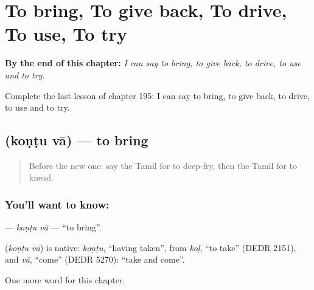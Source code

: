 
\chapter{To bring, To give back, To drive, To use, To try}
\label{ch:ta-to-bring-to-give-back-to-drive-to-use-to-try}

\begin{chapteropening}
\textbf{By the end of this chapter:} \emph{I can say to bring, to give back, to drive, to use and to try.}

Complete the last lesson of chapter 195: I can say to bring, to give back, to drive, to use and to try.
\end{chapteropening}

\section[\texorpdfstring{\ta{கொண்டு} \ta{வா} (koṇṭu vā)}{கொண்டு வா (koṇṭu vā)}]{  (koṇṭu vā) — to bring}

\label{lesson:TA-C195-kontu-va}



\begin{quote}
Before the new one: say the Tamil for to deep-fry, then the Tamil for to knead.
\end{quote}

\subsection*{You'll want to know:  }
\textbf{ } — \emph{koṇṭu vā} — \textquotedblleft{}to bring\textquotedblright{}.

\begin{cousinweb}
\textbf{ } (\emph{koṇṭu vā}) is native: \emph{koṇṭu}, \textquotedblleft{}having taken\textquotedblright{}, from \emph{koḷ}, \textquotedblleft{}to take\textquotedblright{} (DEDR 2151), and \emph{vā}, \textquotedblleft{}come\textquotedblright{} (DEDR 5270): \textquotedblleft{}take and come\textquotedblright{}.
\end{cousinweb}

\begin{grammarlens}[title={What you've built}]
One more word for this chapter.
\end{grammarlens}

